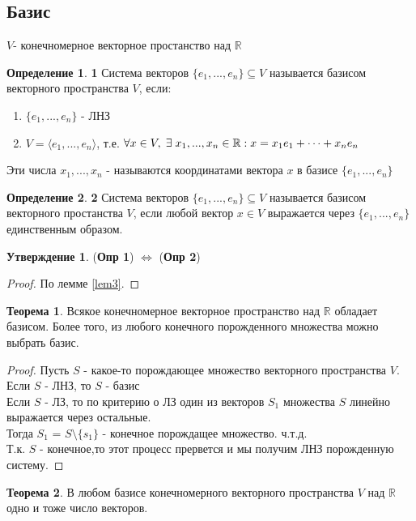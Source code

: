 \documentclass[a4paper, 12pt]{article}
\newcommand{\R}{\mathbb R}
\newcommand\tab[1][.5cm]{\hspace*{#1}}
\theoremstyle{definition}
\newtheorem*{definition}{Определение}
\newtheorem*{theorem}{Теорема}
\newtheorem*{subtheorem}{Утверждение}
\begin{document}
\subsection{Базис}
$V$- конечномерное векторное простанство над $\R$ 
\begin{definition}\tab[-0.1cm]\textbf{1} 
  Система векторов $\{e_1,...,e_n\}\subseteq V$ называется базисом векторного пространства $V$, если:
  \begin{enumerate}
    \item $\{e_1,...,e_n\}$ - ЛНЗ
    \item $V = \langle e_1,...,e_n \rangle$, т.е. $\forall x \in V, \tab[0.1cm] \exists \tab[0.1cm] x_1,...,x_n \in \R: x = x_1e_1+\cdots + x_ne_n$  
  \end{enumerate}
  Эти числа $x_1,...,x_n$ - называются координатами вектора $x$ в базисе $\{e_1,...,e_n\}$ 
\end{definition} 
\begin{definition}\tab[-0.1cm]\textbf{2} 
  Система векторов $\{e_1,...,e_n\} \subseteq V$ называется базисом векторного простанства $V$, если любой вектор $x \in V$ выражается через $\{e_1,...,e_n\}$ единственным образом.
\end{definition} 
  \begin{subtheorem}
    (\textbf{Опр 1}) $\Longleftrightarrow $ (\textbf{Опр 2})
  \end{subtheorem} 
  \begin{proof}
    По лемме \eqref{lem3}.
  \end{proof}
  \begin{theorem}
    Всякое конечномерное векторное пространство над $\R$ обладает базисом. Более того, из любого конечного порожденного множества можно выбрать базис.
  \end{theorem} 
  \begin{proof}
    Пусть $S$ - какое-то порождающее множество векторного пространства $V$. \\
    Если $S$ - ЛНЗ, то $S$ - базис \\
    Если $S$ - ЛЗ, то по критерию о ЛЗ один из векторов $S_1$ множества $S$ линейно выражается через остальные. \\
    Тогда $S_1$ = $S\setminus\{s_1\}$ - конечное порождащее множество. ч.т.д. \\
    Т.к. $S$ - конечное,то этот процесс прервется и мы получим ЛНЗ порожденную систему.
  \end{proof} 
  \begin{theorem}
    В любом базисе конечномерного векторного пространства $V$ над $\R$ одно и тоже число векторов.
  \end{theorem} 
\end{document}
